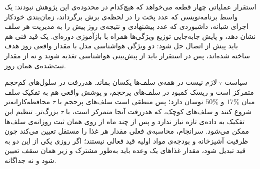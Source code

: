 استقرار عملیاتی چهار قطعه می‌خواهد که هیچ‌کدام در محدوده‌ی این پژوهش نبودند: یک واسط
برنامه‌نویسی که عدد پخت را در لحظه‌ی برش برگرداند، زمان‌بندی خودکار اجرای شبانه،
داشبوردی که عدد پیشنهادی و نتیجه‌ی روز پیش را به مدیریت هر سلف نشان دهد، و پایش
جابه‌جایی توزیع ویژگی‌ها همراه با بازآموزی دوره‌ای. یک قید فنی هم باید پیش از اتصال
حل شود: دو ویژگی هواشناسی مدل با مقدار واقعی روز هدف ساخته شده‌اند، پس در استقرار
باید از پیش‌بینی هواشناسی تغذیه شوند و نه از مقدار ثبت‌شده‌ی همان روز.

سیاست $\tau$ لازم نیست در همه‌ی سلف‌ها یکسان بماند. هدررفت در سلول‌های کم‌حجم متمرکز
است و ریسک کمبود در سلف‌های پرحجم، و پوشش واقعی هم به تفکیک سلف میان $17\%$ و $50\%$
نوسان دارد؛ پس منطقی است سلف‌های پرحجم با $\tau$ محافظه‌کارانه‌تر شروع کنند و سلف‌های
کوچک، که هدررفت آنجا متمرکز است، با $\tau$ بزرگ‌تر. تنظیم این تفکیک به داده‌ی تازه
نیاز ندارد و پس از چند ماه از روی همان ثبت روزانه‌ی سلف‌ها ممکن می‌شود. سرانجام، محاسبه‌ی
فعلی مقدار هر غذا را مستقل تعیین می‌کند چون ظرفیت آشپزخانه و بودجه‌ی مواد اولیه قید
فعالی نیستند؛ اگر روزی یکی از این دو به قید تبدیل شود، مقدار غذاهای یک وعده باید
به‌طور مشترک و زیر همان سقف تعیین شود و نه جداگانه.
